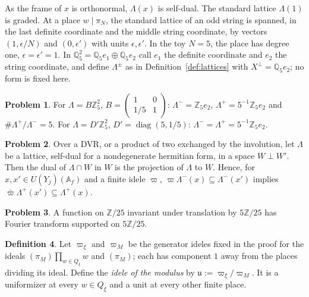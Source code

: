 \documentclass[reqno]{amsart}
\theoremstyle{definition}
\newtheorem{problem}{Problem}[section]
\newtheorem{definition}[problem]{Definition}
\theoremstyle{plain}
\theoremstyle{remark}
\newcommand{\Z}{\mathbb{Z}}
\newcommand{\Q}{\mathbb{Q}}
\newcommand{\Af}{\mathbb{A}_f}
\newcommand{\uu}{\mathfrak{u}}
\newcommand{\diag}{\operatorname{diag}}
\begin{document}
As the frame of \(x\) is orthonormal, \(\Lambda(x)\) is self-dual.  The standard lattice \(\Lambda(1)\) is graded.  At a place \(w\mid\pi_N\), the standard lattice of an odd string is spanned, in the last definite coordinate and the middle string coordinate, by vectors \((1,\epsilon/N)\) and \((0,\epsilon')\) with units \(\epsilon,\epsilon'\).  In the toy \(N=5\), the place has degree one, \(\epsilon=\epsilon'=1\).  In \(\Q_5^2=\Q_5e_1\oplus\Q_5e_2\) call \(e_1\) the definite coordinate and \(e_2\) the string coordinate, and define \(\Lambda^\pm\) as in Definition~\ref{def:lattices} with \(X^\perp=\Q_5e_2\); no form is fixed here.

\begin{problem}\label{pr:toy-lattice}
For \(\Lambda=B\Z_5^2\), \(B=\left(\begin{smallmatrix}1&0\\1/5&1\end{smallmatrix}\right)\): \(\Lambda^-=\Z_5e_2\), \(\Lambda^+=5^{-1}\Z_5e_2\) and \(\#\Lambda^+/\Lambda^-=5\).  For \(\Lambda=D'\Z_5^2\), \(D'=\diag(5,1/5)\): \(\Lambda^-=\Lambda^+=5^{-1}\Z_5e_2\).
\end{problem}

\begin{problem}\label{pr:dual}
Over a DVR, or a product of two exchanged by the involution, let \(\Lambda\) be a lattice, self-dual for a nondegenerate hermitian form, in a space \(W\perp W'\).  Then the dual of \(\Lambda\cap W\) in \(W\) is the projection of \(\Lambda\) to \(W\).  Hence, for \(x,x'\in U(Y_j)(\Af)\) and a finite idele \(\varpi\), \(\varpi\Lambda^-(x)\subseteq\Lambda^-(x')\) implies \(\bar\varpi\Lambda^+(x')\subseteq\Lambda^+(x)\).
\end{problem}

\begin{problem}\label{pr:fourier}
A function on \(\Z/25\) invariant under translation by \(5\Z/25\) has Fourier transform supported on \(5\Z/25\).
\end{problem}

\begin{definition}\label{def:u}
Let \(\varpi_\xi\) and \(\varpi_M\) be the generator ideles fixed in the proof for the ideals \((\pi_M)\prod_{w\in Q_\xi}w\) and \((\pi_M)\); each has component \(1\) away from the places dividing its ideal.  Define the \emph{idele of the modulus} by \(\uu:=\varpi_\xi/\varpi_M\).  It is a uniformizer at every \(w\in Q_\xi\) and a unit at every other finite place.
\end{definition}
\end{document}
